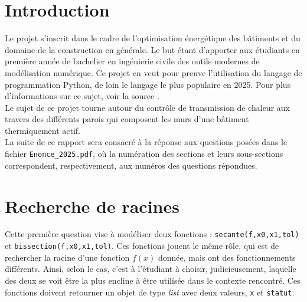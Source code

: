 \documentclass[12pt]{article}
\begin{document}
\sloppy %




\renewcommand{\contentsname}{Table des matières}
\renewcommand{\listfigurename}{Table des figures}
\renewcommand{\listtablename}{Liste des tableaux}

\tableofcontents
\newpage
\listoffigures
\listoftables
\newpage


\renewcommand\thesection{0} %
\section{Introduction}

Le projet s'inscrit dans le cadre de l'optimisation énergétique des bâtiments et du domaine de la construction en générale. Le but étant d'apporter aux étudiants en première année de bachelier en ingénierie civile des outils modernes de modélisation numérique. Ce projet en veut pour preuve l'utilisation du langage de programmation Python, de loin le langage le plus populaire en 2025. Pour plus d'informations sur ce sujet, voir la source \cite{Tiobe2025}. \\
Le sujet de ce projet tourne autour du contrôle de transmission de chaleur aux travers des différents parois qui composent les murs d'une bâtiment thermiquement actif. \\
La suite de ce rapport sera consacré à la réponse aux questions posées dans le fichier \texttt{Enonce\_2025.pdf}, où la numération des sections et leurs sous-sections correspondent, respectivement, aux numéros des questions répondues.

\renewcommand\thesection{\arabic{section}} %
\setcounter{section}{0} %

\section{Recherche de racines}

Cette première question vise à modéliser deux fonctions : \texttt{secante(f,x0,x1,tol)} et \texttt{bissection(f,x0,x1,tol)}. Ces fonctions jouent le même rôle, qui est de rechercher la racine d'une fonction $f(x)$ donnée, mais ont des fonctionnements différents. Ainsi, selon le cas, c'est à l'étudiant à choisir, judicieusement, laquelle des deux se voit être la plus encline à être utilisée dans le contexte rencontré. Ces fonctions doivent retourner un objet de type \textit{list} avec deux valeurs, \texttt{x} et \texttt{statut}.
\end{document}
